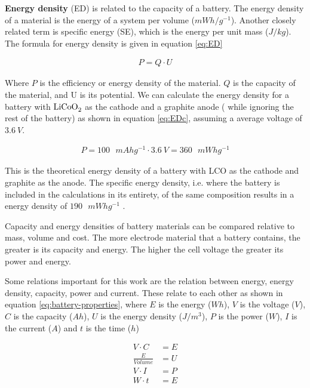 \textbf{Energy density} (\ac{ED}) is related to the capacity of a battery. The energy density of a material is the energy of a system per volume ($\si{mWh/g^{-1}}$). Another closely related term is specific energy (\ac{SE}), which is the energy per unit mass ($\si{J/kg}$). The formula for energy density is given in equation \ref{eq:ED}
	
	\begin{align}\label{eq:ED}
	P = Q \cdot U
	\end{align}

Where $P$ is the efficiency or energy density of the material. $Q$ is the capacity of the material, and U is its potential. We can calculate the energy density for a battery with $\ce{LiCoO_2}$  as the cathode and a graphite  anode ( while ignoring the rest of the battery) as shown in equation \ref{eq:EDc}, assuming a average voltage of $\SI{3.6}{V}$. 

\begin{align}\label{eq:EDc}
P = 100\text{ }\si{mAhg^{-1}} \cdot \SI{3.6}{V}  = 360 \text{ } \si{mWhg^{-1}}
\end{align} 

This is the theoretical energy density of a battery with LCO as the cathode and graphite as the anode. The specific energy density, i.e. where the battery is included in the calculations in its entirety, of the same composition results in a energy density of $190\text{ } \si{mWhg^{-1}}$ \cite{srinivasan2008batteries}.  
	
 	Capacity and energy densities of battery materials can be compared relative to mass, volume and cost. The more electrode material that a battery contains, the greater is its capacity and energy. The higher the cell voltage the greater its power and energy. 
	

Some relations important for this work are the relation between energy, energy density, capacity, power and current. These relate to each other as shown in equation \ref{eq:battery-properties}, where $E$ is the energy ($\si{Wh}$), $V$ is the voltage ($\si{V}$), $C$ is the capacity ($\si{Ah}$), $U$ is the energy density ($\si{J/m^3}$), $P$ is the power ($\si{W}$), $I$ is the current ($\si{A}$) and $t$ is the time ($\si{h}$)

\begin{align}\label{eq:battery-properties}
V \cdot C &= E \\
\frac{E}{Volume} &= U  \\
V \cdot I &= P \\
W \cdot t &= E 
\end{align}




